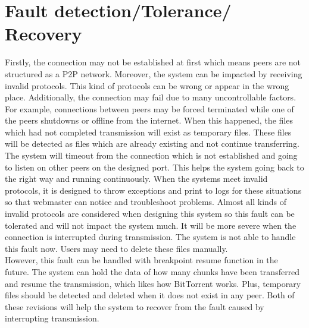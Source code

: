 \documentclass[a4paper,10pt,titlepage,twocolumn]{article}
\begin{document}
    \section*{Fault detection/Tolerance/ Recovery}
    Firstly, the connection may not be established at first which means peers are not structured as a P2P network. Moreover, the system can be impacted by receiving invalid protocols. This kind of protocols can be wrong or appear in the wrong place. Additionally, the connection may fail due to many uncontrollable factors. For example, connections between peers may be forced terminated while one of the peers shutdowns or offline from the internet. When this happened, the files which had not completed transmission will exist as temporary files. These files will be detected as files which are already existing and not continue transferring.
    \\The system will timeout from the connection which is not established and going to listen on other peers on the designed port. This helps the system going back to the right way and running continuously. When the systems meet invalid protocols, it is designed to throw exceptions and print to logs for these situations so that webmaster can notice and troubleshoot problems. Almost all kinds of invalid protocols are considered when designing this system so this fault can be tolerated and will not impact the system much. It will be more severe when the connection is interrupted during transmission. The system is not able to handle this fault now. Users may need to delete these files manually. 
    \\However, this fault can be handled with breakpoint resume function in the future. The system can hold the data of how many chunks have been transferred and resume the transmission, which likes how BitTorrent works. Plus, temporary files should be detected and deleted when it does not exist in any peer. Both of these revisions will help the system to recover from the fault caused by interrupting transmission.
\end{document}
